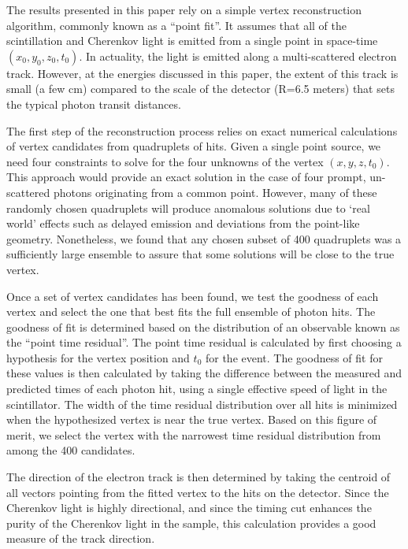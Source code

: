 \documentclass[cits]{JINST}
\begin{document}
The results presented in this paper rely on a simple vertex
reconstruction algorithm, commonly known as a ``point
fit''\cite{SuperKalgo}. It assumes that all of the scintillation and
Cherenkov light is emitted from a single point in space-time
$(x_0,y_0,z_0,t_0)$. In actuality, the light is emitted along a multi-scattered electron track. However, at the energies
discussed in this paper, the extent of this track is small (a few cm)
compared to the scale of the detector (R=6.5 meters) that sets the typical
photon transit distances.

The first step of the reconstruction process relies on exact numerical
calculations of vertex candidates from quadruplets of hits. Given a
single point source, we need four constraints to solve for the four
unknowns of the vertex $(x,y,z,t_0)$\cite{Smy}. This approach
would provide an exact solution in the case of four prompt,
un-scattered photons originating from a common point. However, many of
these randomly chosen quadruplets will produce anomalous solutions due
to `real world' effects such as delayed emission and deviations from the
point-like geometry. Nonetheless, we found that any chosen subset of
400 quadruplets was a sufficiently large ensemble to assure that some
solutions will be close to the true vertex.

Once a set of vertex candidates has been found, we test the goodness
of each vertex and select the one that best fits the full ensemble of
photon hits. The goodness of fit is determined based on the
distribution of an observable known as the ``point time
residual''\cite{SuperKalgo}. The point time residual is calculated by first choosing a hypothesis for the vertex position and $t_0$ for the event. The goodness of fit for these values  is then calculated by taking the difference between the measured and predicted times of each photon hit, using a single effective speed of light in the scintillator. The width of the time residual
distribution over all hits is minimized when the hypothesized vertex
is near the true vertex. Based on this figure of merit, we select the
vertex with the narrowest time residual distribution from among the
400 candidates.

The direction of the electron track is then determined by taking the
centroid of all vectors pointing from the fitted vertex to the hits on
the detector. Since the Cherenkov light is highly directional, and
since the timing cut enhances the purity of the Cherenkov light in the
sample, this calculation provides a good measure of the track
direction. 
\end{document}
